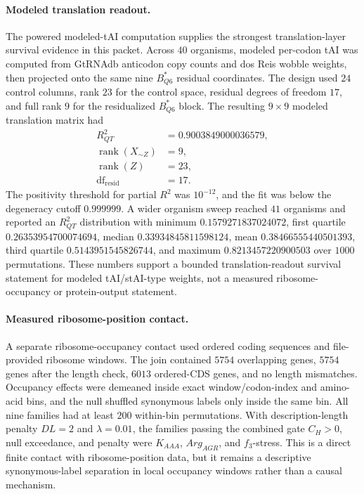 \paragraph{Modeled translation readout.}
The powered modeled-tAI computation supplies the strongest translation-layer survival evidence in this packet.  Across $40$ organisms, modeled per-codon tAI was computed from GtRNAdb anticodon copy counts and dos Reis wobble weights, then projected onto the same nine $B^*_{Q6}$ residual coordinates.  The design used $24$ control columns, rank $23$ for the control space, residual degrees of freedom $17$, and full rank $9$ for the residualized $B^*_{Q6}$ block.  The resulting $9\times 9$ modeled translation matrix had
$$
\begin{aligned}
R^2_{QT} &= 0.9003849000036579,\\
\operatorname{rank}(X_{\sim Z}) &= 9,\\
\operatorname{rank}(Z) &= 23,\\
\mathrm{df}_{\mathrm{resid}} &= 17.
\end{aligned}
$$
The positivity threshold for partial $R^2$ was $10^{-12}$, and the fit was below the degeneracy cutoff $0.999999$.  A wider organism sweep reached $41$ organisms and reported an $R^2_{QT}$ distribution with minimum $0.1579271837024072$, first quartile $0.26353954700074694$, median $0.33934845811598124$, mean $0.38466555440501393$, third quartile $0.5143951545826744$, and maximum $0.8213457220900503$ over $1000$ permutations.  These numbers support a bounded translation-readout survival statement for modeled tAI/stAI-type weights, not a measured ribosome-occupancy or protein-output statement.

\paragraph{Measured ribosome-position contact.}
A separate ribosome-occupancy contact used ordered coding sequences and file-provided ribosome windows.  The join contained $5754$ overlapping genes, $5754$ genes after the length check, $6013$ ordered-CDS genes, and no length mismatches.  Occupancy effects were demeaned inside exact window/codon-index and amino-acid bins, and the null shuffled synonymous labels only inside the same bin.  All nine families had at least $200$ within-bin permutations.  With description-length penalty $DL=2$ and $\lambda=0.01$, the families passing the combined gate $C_H>0$, null exceedance, and penalty were $K_{AAA}$, $Arg_{AGR}$, and $f_3$-stress.  This is a direct finite contact with ribosome-position data, but it remains a descriptive synonymous-label separation in local occupancy windows rather than a causal mechanism.

